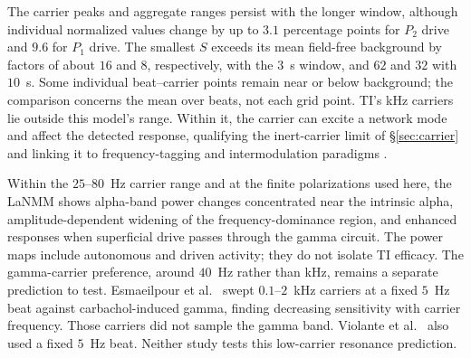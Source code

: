 The carrier peaks and aggregate ranges persist with the longer window, although
individual normalized values change by up to $3.1$ percentage points for $P_2$
drive and $9.6$ for $P_1$ drive. The smallest $S$ exceeds its mean field-free
background by factors of about $16$ and $8$, respectively, with the $3$~s window,
and $62$ and $32$ with $10$~s. Some individual beat--carrier points remain near or below
background; the comparison concerns the mean over beats, not each grid point.
TI's kHz carriers lie outside this model's range. Within it, the carrier can
excite a network mode and affect the detected response, qualifying the inert-carrier
limit of \S\ref{sec:carrier} and linking it to frequency-tagging and
intermodulation paradigms \cite{gordon2019}.




Within the $25$--$80$~Hz carrier range and at the finite polarizations used here,
the LaNMM shows alpha-band power changes concentrated near the intrinsic alpha,
amplitude-dependent widening of the frequency-dominance region, and enhanced
responses when superficial drive passes through the gamma circuit. The power
maps include autonomous and driven activity; they do not isolate TI efficacy.
The gamma-carrier preference, around $40$~Hz rather than kHz, remains a separate
prediction to test. Esmaeilpour et al.\ \cite{esmaeilpour2021} swept
$0.1$--$2$~kHz carriers at a fixed $5$~Hz beat against carbachol-induced gamma,
finding decreasing sensitivity with carrier frequency. Those carriers did not
sample the gamma band. Violante et al.\ \cite{violante2023} also used a fixed
$5$~Hz beat. Neither study tests this low-carrier resonance prediction.



